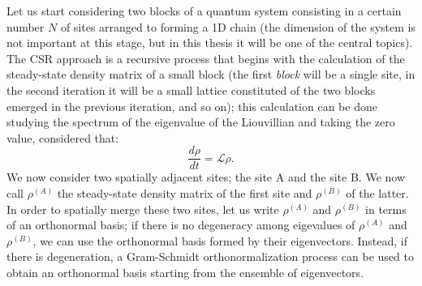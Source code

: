 Let us start considering two blocks of a quantum system consisting in a certain number $N$ of sites arranged to forming a 1D chain (the dimension of the system is not important at this stage, but in this thesis it will be one of the central topics). The CSR approach is a recursive process that begins with the calculation of the steady-state density matrix of a small block (the first \emph{block} will be a single site, in the second iteration it will be a small lattice constituted of the two blocks emerged in the previous iteration, and so on); this calculation can be done studying the spectrum of the eigenvalue of the Liouvillian and taking the zero value, considered that:
\begin{equation}
    \frac{d\rho}{dt} = \mathcal{L} \rho.
\end{equation}
We now consider two spatially adjacent sites; the site A and the site B. We now call $\rho^{(A)}$ the steady-state density matrix of the first site and $\rho^{(B)}$ of the latter. In order to spatially merge these two sites, let us write $\rho^{(A)}$ and $\rho^{(B)}$ in terms of an orthonormal basis; if there is no degeneracy among eigevalues of $\rho^{(A)}$ and $\rho^{(B)}$, we can use the orthonormal basis formed by their eigenvectors. Instead, if there is degeneration, a Gram-Schmidt orthonormalization process can be used to obtain an orthonormal basis starting from the ensemble of eigenvectors.

